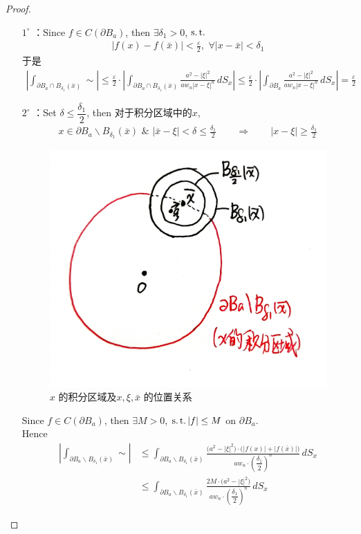 \begin{thm}
\begin{proof}
\begin{enumerate}
				\begin{enumerate}
					\item[\underline{\textbf{$1^{\circ}$}}]：Since $f \in C(\partial B_a)$, then $\exists \delta_1 > 0$, $\operatorname{s.t.}$
					\begin{align*}
						| f(x) - f(\bar{x}) | < \frac{\varepsilon}{2} , \,\, \forall | x - \bar{x} | < \delta_1
					\end{align*}
					于是
					\begin{align*}
						\left| \int_{\partial B_a \cap B_{\delta_1}(\bar{x})} \sim \right| 
						\leq \frac{\varepsilon}{2} \cdot \left| \int_{\partial B_a \cap B_{\delta_1}(\bar{x})} \frac{a^2 - | \xi |^2}{a w_n | x - \xi |^n} \, dS_x \right| 
						\leq \frac{\varepsilon}{2} \cdot \left| \int_{\partial B_a} \frac{a^2 - | \xi |^2}{a w_n | x - \xi |^n} \, dS_x \right| = \frac{\varepsilon}{2}
					\end{align*}
					
					\vspace*{4em}
					
					\item[\underline{\textbf{$2^{\circ}$}}]：Set $\delta \leq \dfrac{\delta_1}{2}$, then 对于积分区域中的$x$, 
					\begin{align*}
						x \in \partial B_a \backslash B_{\delta_1}(\bar{x}) \,\, \& \,\, | \bar{x} - \xi | < \delta \leq \frac{\delta_1}{2} \hspace{2em} \Rightarrow \hspace{2em} | x - \xi | \geq \frac{\delta_1}{2}
					\end{align*}
					
					\begin{figure}[thbp!]
						\centering
						\includegraphics[width=0.3\linewidth]{figure/3.5-3}
						\caption{$x$ 的积分区域及$x , \xi , \bar{x}$ 的位置关系}
						\label{pic : 3.5-3} %
					\end{figure}
					
					Since $f \in C(\partial B_a)$, then $\exists M > 0$, $\operatorname{s.t.} | f | \leq M$ on $\partial B_a$. \\
					Hence
					\begin{align*}
						\left| \int_{\partial B_a \backslash B_{\delta_1}(\bar{x})} \sim \right| 
						&\leq \int_{\partial B_a \backslash B_{\delta_1}(\bar{x})} \frac{\Big( a^2 - | \xi |^2 \Big) \cdot \Big( \left| f(x) \right| + \left| f(\bar{x}) \right| \Big)}{a w_n \cdot \left( \dfrac{\delta_1}{2} \right)^n} \, dS_x \\
						&\leq \int_{\partial B_a \backslash B_{\delta_1}(\bar{x})} \frac{2M \cdot \Big( a^2 - | \xi |^2 \Big) }{a w_n \cdot \left( \dfrac{\delta_1}{2} \right)^n} \, dS_x 
					\end{align*}
					

\end{enumerate}
\end{enumerate}
\end{proof}
\end{thm}
